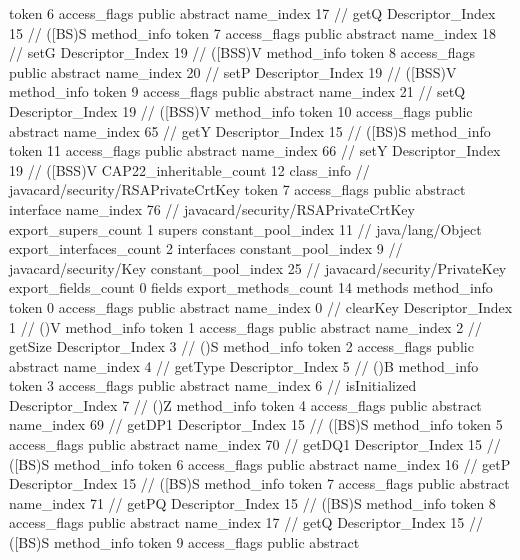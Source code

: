 {{{{{					token	6
					access_flags	public abstract
					name_index	17		// getQ
					Descriptor_Index	15		// ([BS)S
				}
				method_info {
					token	7
					access_flags	public abstract
					name_index	18		// setG
					Descriptor_Index	19		// ([BSS)V
				}
				method_info {
					token	8
					access_flags	public abstract
					name_index	20		// setP
					Descriptor_Index	19		// ([BSS)V
				}
				method_info {
					token	9
					access_flags	public abstract
					name_index	21		// setQ
					Descriptor_Index	19		// ([BSS)V
				}
				method_info {
					token	10
					access_flags	public abstract
					name_index	65		// getY
					Descriptor_Index	15		// ([BS)S
				}
				method_info {
					token	11
					access_flags	public abstract
					name_index	66		// setY
					Descriptor_Index	19		// ([BSS)V
				}
			}
			CAP22_inheritable_count	12
		}
		class_info {		// javacard/security/RSAPrivateCrtKey
			token	7
			access_flags	public abstract interface
			name_index	76		// javacard/security/RSAPrivateCrtKey
			export_supers_count	1
			supers {
				constant_pool_index	11		// java/lang/Object
			}
			export_interfaces_count	2
			interfaces {
				constant_pool_index	9		// javacard/security/Key
				constant_pool_index	25		// javacard/security/PrivateKey
			}
			export_fields_count	0
			fields {
			}
			export_methods_count	14
			methods {
				method_info {
					token	0
					access_flags	public abstract
					name_index	0		// clearKey
					Descriptor_Index	1		// ()V
				}
				method_info {
					token	1
					access_flags	public abstract
					name_index	2		// getSize
					Descriptor_Index	3		// ()S
				}
				method_info {
					token	2
					access_flags	public abstract
					name_index	4		// getType
					Descriptor_Index	5		// ()B
				}
				method_info {
					token	3
					access_flags	public abstract
					name_index	6		// isInitialized
					Descriptor_Index	7		// ()Z
				}
				method_info {
					token	4
					access_flags	public abstract
					name_index	69		// getDP1
					Descriptor_Index	15		// ([BS)S
				}
				method_info {
					token	5
					access_flags	public abstract
					name_index	70		// getDQ1
					Descriptor_Index	15		// ([BS)S
				}
				method_info {
					token	6
					access_flags	public abstract
					name_index	16		// getP
					Descriptor_Index	15		// ([BS)S
				}
				method_info {
					token	7
					access_flags	public abstract
					name_index	71		// getPQ
					Descriptor_Index	15		// ([BS)S
				}
				method_info {
					token	8
					access_flags	public abstract
					name_index	17		// getQ
					Descriptor_Index	15		// ([BS)S
				}
				method_info {
					token	9
					access_flags	public abstract
}}}}}
